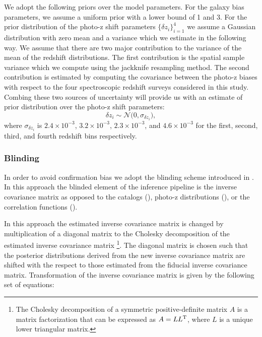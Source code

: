 \documentclass[fleqn,usenatbib,useAMS]{mnras}
\newcommand{\mjv}{\textcolor{cyan}}
\begin{document}



We adopt the following priors over the model parameters. For the galaxy bias parameters, we assume a uniform prior with a lower bound of 1 and 3. For the prior distribution of the photo-z shift parameters $\{\delta z _{i}\}_{i=1}^{4}$ we assume a Gaussian distribution with zero mean and a variance which we estimate in the following way. We assume that there are two major contribution to the variance of the mean of the redshift distributions. The first contribution is the spatial sample variance which we compute using the jackknife resampling method. The second contribution is estimated by computing the covariance between the photo-z biases with respect to the four spectroscopic redshift surveys considered in this study. Combing these two sources of uncertainty will provide us with an estimate of prior distribution over the photo-z shift parameters:
\begin{equation}
    \delta z_{i} \sim \mathcal{N}\big(0, \sigma_{\delta z_{i}}\big),
\end{equation}
where $\sigma_{\delta z_{i}}$ is $2.4\times 10^{-3}$, $3.2\times 10^{-3}$, $2.3\times 10^{-3}$, and $4.6\times 10^{-3}$ for the first, second, third, and fourth redshift bins respectively.  
\subsubsection{Blinding}

In order to avoid confirmation bias we adopt the blinding scheme introduced in \citep{sellentin2019}. In this approach the blinded element of the inference pipeline is the inverse covariance matrix as opposed to the catalogs (\citealt{hendrick2017}), photo-z distributions (\citealt{hendrik2020}), or the correlation functions (\citealt{muir2019}). 

In this approach the estimated inverse covariance matrix is changed by multiplication of a diagonal matrix to the Cholesky decomposition of the estimated inverse covariance matrix \footnote{The Cholesky decomposition of a symmetric positive-definite matrix $A$ is a matrix factorization that can be expressed as $A = LL^{\rm T}$, where $L$ is a unique lower triangular matrix.}. The diagonal matrix is chosen such that the posterior distributions derived from the new inverse covariance matrix are shifted with the respect to those estimated from the fiducial inverse covariance matrix. Transformation of the inverse covariance matrix is given by the following set of equations:
\end{document}
